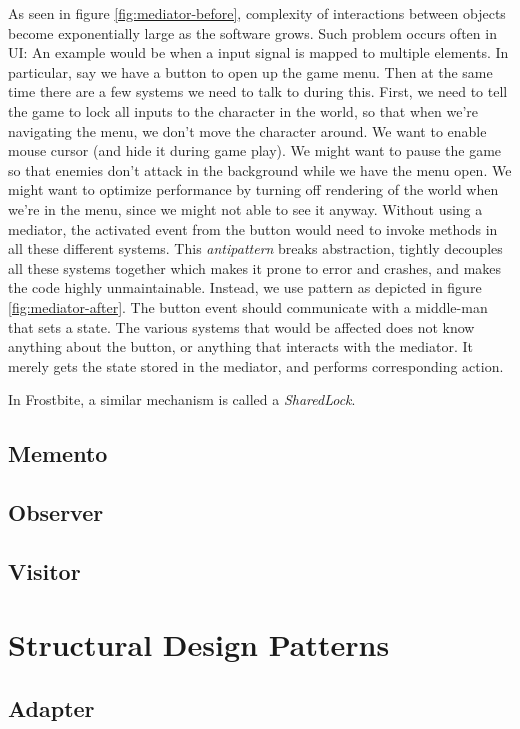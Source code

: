 \documentclass[10pt,letterpaper]{article}
\newcommand{\bs}{\bigskip}
\begin{document}
\begin{multicols}{2}
As seen in figure \ref{fig:mediator-before}, complexity of interactions between objects become exponentially large as the software grows.
\bs
Such problem occurs often in UI: An example would be when a input signal is mapped to multiple elements. In particular, say we have a button to open up the game menu. Then at the same time there are a few systems we need to talk to during this. First, we need to tell the game to lock all inputs to the character in the world, so that when we're navigating the menu, we don't move the character around. We want to enable mouse cursor (and hide it during game play). We might want to pause the game so that enemies don't attack in the background while we have the menu open. We might want to optimize performance by turning off rendering of the world when we're in the menu, since we might not able to see it anyway.
\bs
Without using a mediator, the activated event from the button would need to invoke methods in all these different systems. This \textit{antipattern} breaks abstraction, tightly decouples all these systems together which makes it prone to error and crashes, and makes the code highly unmaintainable.
\bs
Instead, we use pattern as depicted in figure \ref{fig:mediator-after}. The button event should communicate with a middle-man that sets a state. The various systems that would be affected does not know anything about the button, or anything that interacts with the mediator. It merely gets the state stored in the mediator, and performs corresponding action.
\bs

In Frostbite, a similar mechanism is called a \textit{SharedLock}. 

\subsection{Memento}

\subsection{Observer}

\subsection{Visitor}

\section{Structural Design Patterns}

\subsection{Adapter}


\end{multicols}
\end{document}
